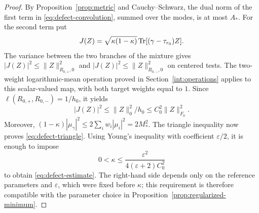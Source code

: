 \begin{proof}
By Proposition~\ref{prop:metric} and Cauchy--Schwarz, the dual norm of the
first term in \eqref{eq:defect-convolution}, summed over the modes, is at
most $A_*$.  For the second term put
\[
 J(Z)=\sqrt{\kappa(1-\kappa)}\operatorname{Tr}[(\gamma-\tau_{r_0})Z].
\]
The variance between the two branches of the mixture gives
$|J(Z)|^2\le\|Z\|_{R_{0,+},0}^2$ and
$|J(Z)|^2\le\|Z\|_{R_{0,-},0}^2$ on centered tests.
The two-weight logarithmic-mean operation proved in
Section~\ref{int:operations} applies to this scalar-valued map,
with both target weights equal to $1$.
Since $\ell(R_{0,+},R_{0,-})=1/h_0$, it yields
\[
 |J(Z)|^2\le\|Z\|_0^2/h_0
 \le C_0^2\|Z\|_{F_0}^2.
\]
Moreover,
$(1-\kappa)|\mu_\gamma|^2\le2\sum_iw_i|\mu_i|^2=2M_*^2$.
The triangle inequality now proves \eqref{eq:defect-triangle}.
Using Young's inequality with coefficient $\varepsilon/2$, it is enough
to impose
\[
 0<\kappa\le\frac{\varepsilon^2}{4(\varepsilon+2)C_0^2}
\]
to obtain \eqref{eq:defect-estimate}.  The right-hand side depends only on
the reference parameters and $\varepsilon$, which were fixed before
$\kappa$; this requirement is therefore compatible with the parameter
choice in Proposition~\ref{prop:regularized-minimum}.
\end{proof}
